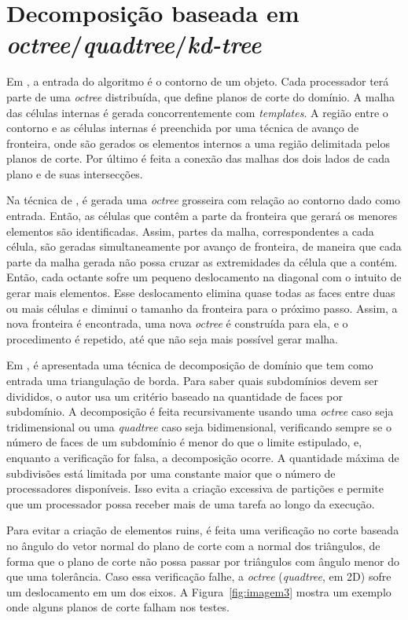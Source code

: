 \section{Decomposição baseada em \textit{octree}/\textit{quadtree}/\textit{kd-tree}}

Em \cite{bib:deCougny99}, a entrada do algoritmo é o contorno de um objeto. Cada processador terá parte de uma \textit{octree} distribuída, que define planos de corte do domínio. A malha das células internas é gerada concorrentemente com \textit{templates}. A região entre o contorno e as células internas é preenchida por uma técnica de avanço de fronteira, onde são gerados os elementos internos a uma região delimitada pelos planos de corte. Por último é feita a conexão das malhas dos dois lados de cada plano e de suas intersecções.

Na técnica de \cite{bib:Lohner01}, é gerada uma \textit{octree} grosseira com relação ao contorno dado como entrada. Então, as células que contêm a parte da fronteira que gerará os menores elementos são identificadas. Assim, partes da malha, correspondentes a cada célula, são geradas simultaneamente por avanço de fronteira, de maneira que cada parte da malha gerada não possa cruzar as extremidades da célula que a contém. Então, cada octante sofre um pequeno deslocamento na diagonal com o intuito de gerar mais elementos. Esse deslocamento elimina quase todas as faces entre duas ou mais células e diminui o tamanho da fronteira para o próximo passo. Assim, a nova fronteira é encontrada, uma nova \textit{octree} é construída para ela, e o procedimento é repetido, até que não seja mais possível gerar malha.

Em \cite{bib:Larwood03}, é apresentada uma técnica de decomposição de domínio que tem como entrada uma triangulação de borda. Para saber quais subdomínios devem ser divididos, o autor usa um critério baseado na quantidade de faces por subdomínio. A decomposição é feita recursivamente usando uma \textit{octree} caso seja tridimensional ou uma \textit{quadtree} caso seja bidimensional, verificando sempre se o número de faces de um subdomínio é menor do que o limite estipulado, e, enquanto a verificação for falsa, a decomposição ocorre. A quantidade máxima de subdivisões está limitada por uma constante maior que o número de processadores disponíveis. Isso evita a criação excessiva de partições e permite que um processador possa receber mais de uma tarefa ao longo da execução.

Para evitar a criação de elementos ruins, é feita uma verificação no corte baseada no ângulo do vetor normal do plano de corte com a normal dos triângulos, de forma que o plano de corte não possa passar por triângulos com ângulo menor do que uma tolerância. Caso essa verificação falhe, a \textit{octree} (\textit{quadtree}, em 2D) sofre um deslocamento em um dos eixos. A Figura~\ref{fig:imagem3} mostra um exemplo onde alguns planos de corte falham nos testes.


